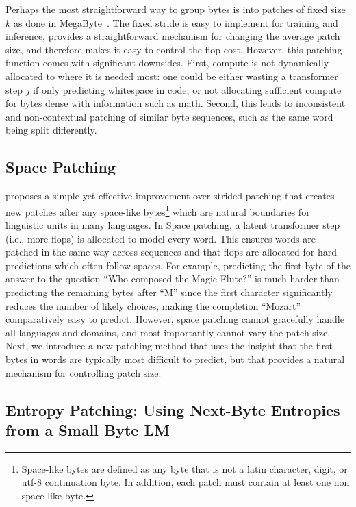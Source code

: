 Perhaps the most straightforward way to group bytes is into patches of fixed size $k$ as done in MegaByte~\citep{yu2023megabyte}. The fixed stride is easy to implement for training and inference, provides a straightforward mechanism for changing the average patch size, and therefore makes it easy to control the flop cost. However, this patching function comes with significant downsides. First, compute is not dynamically allocated to where it is needed most: one could be either wasting a transformer step $j$ if only predicting whitespace in code, or not allocating sufficient compute for bytes dense with information such as math. Second, this leads to inconsistent and non-contextual patching of similar byte sequences, such as the same word being split differently.

\subsection{Space Patching}
\label{section:white-patch}

\citet{slagle2024spacebyte} proposes a simple yet effective improvement over strided patching that creates new patches after any space-like bytes\footnote{
    Space-like bytes are defined as any byte that is not a latin character, digit, or utf-8 continuation byte. In addition, each patch must contain at least one non space-like byte. } which are natural boundaries for linguistic units in many languages. In Space patching, a latent transformer step (i.e., more flops) is allocated to model every word. This ensures words are patched in the same way across sequences and that flops are allocated for hard predictions which often follow spaces. For example, predicting the first byte of the answer to the question ``Who composed the Magic Flute?\uline{\hspace{.6em}}'' is much harder than predicting the remaining bytes after ``M'' since the first character significantly reduces the number of likely choices, making the completion ``Mozart'' comparatively easy to predict. However, space patching cannot gracefully handle all languages and domains, and most importantly cannot vary the patch size. Next, we introduce a new patching method that uses the insight that the first bytes in words are typically most difficult to predict, but that provides a natural mechanism for controlling patch size.

\subsection{Entropy Patching: Using Next-Byte Entropies from a Small Byte LM}
\label{section:dyn-patch}

